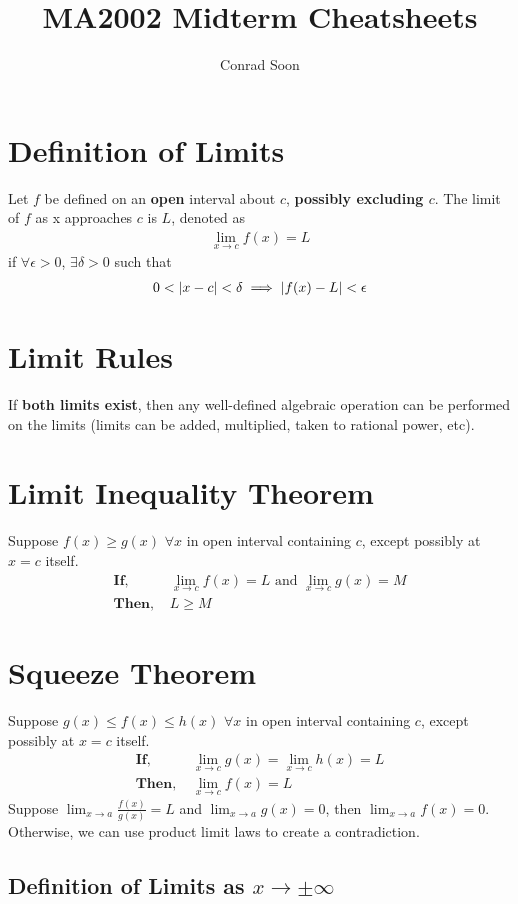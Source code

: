 \documentclass{article}
\title{MA2002 Midterm Cheatsheets}
\author{Conrad Soon}
\DeclarePairedDelimiter\abs{\lvert}{\rvert}%
\begin{document}
\begin{multicols*}{3}
\maketitle
\section{Definition of Limits}
    Let $f$ be defined on an \textbf{open} interval about $c$, \textbf{possibly excluding $c$}. The limit of $f$ as x approaches $c$ is $L$, denoted as 
	\begin{align*}
		\lim_{x\to c}{f(x)} = L
	\end{align*}
	if $\forall \epsilon > 0$, $\exists \delta > 0$ such that
	\begin{align*}
		0 < \abs{x-c} < \delta \implies \abs{f(x)-L}<\epsilon
	\end{align*}
\section{Limit Rules}
	If \textbf{both limits exist}, then any well-defined algebraic operation can be performed on the limits (limits can be added, multiplied, taken to rational power, etc).
\section{Limit Inequality Theorem}
	Suppose $f(x) \geq g(x)$ $\forall x$ in open interval containing $c$, except possibly at $x=c$ itself.
	\begin{align*}
		\textbf{If, }&\lim_{x\to c}{f(x)} = L \text{ and } \lim_{x\to c}{g(x)} = M\\
		\textbf{Then, }&L \geq M
	\end{align*}
\section{Squeeze Theorem}
	Suppose $g(x) \leq f(x) \leq h(x)$ $\forall x$ in open interval containing $c$, except possibly at $x=c$ itself.
	\begin{align*}
		\textbf{If, }&\lim_{x\to c}{g(x)} = \lim_{x\to c}{h(x)} = L\\
		\textbf{Then, }&\lim_{x\to c}{f(x)} = L
	\end{align*}
Suppose $\lim_{x\to a}{\frac{f(x)}{g(x)}} = L$ and $\lim_{x \to a}{g(x)} = 0$, then $\lim_{x\to a}{f(x)}=0$. Otherwise, we can use product limit laws to create a contradiction. 
\subsection{Definition of Limits as $x \to \pm\infty$}
\end{multicols*}
\end{document}
